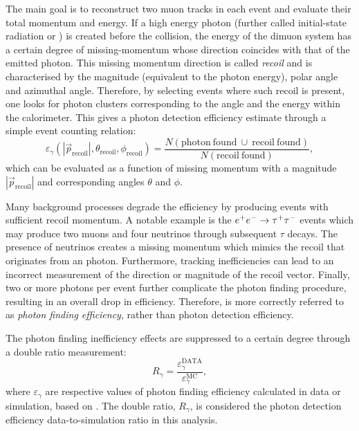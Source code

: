 The main goal is to reconstruct two muon tracks in each event and evaluate their total momentum and energy.
If a high energy photon (further called initial-state radiation or \ISR) is created before the collision, the energy of the dimuon system has a certain degree of missing-momentum whose direction coincides with that of the emitted photon.
This missing momentum direction is called \textit{recoil} and is characterised by the magnitude (equivalent to the photon energy), polar angle and azimuthal angle.
Therefore, by selecting events where such recoil is present, one looks for photon clusters corresponding to the angle and the energy within the calorimeter.
This gives a photon detection efficiency estimate through a simple event counting relation:
\begin{equation}\label{eq:photon_efficiency}
    \varepsilon_{\gamma}(|\vec{p}_{\mathrm{recoil}}|, \theta_{\mathrm{recoil}}, \phi_{\mathrm{recoil}}) = \frac{N(\mathrm{photon~found}~\cup~\mathrm{recoil~found})}{N(\mathrm{recoil~found})},
\end{equation}
which can be evaluated as a function of missing momentum with a magnitude $|\vec{p}_{\mathrm{recoil}}|$ and corresponding angles $\theta$ and $\phi$.

Many background processes degrade the efficiency by producing events with sufficient recoil momentum.
A notable example is the $e^+e^-\rightarrow\tau^+\tau^-$ events which may produce two muons and four neutrinos through subsequent $\tau$ decays.
The presence of neutrinos creates a missing momentum which mimics the recoil that originates from an \ISR photon.
Furthermore, tracking inefficiencies can lead to an incorrect measurement of the direction or magnitude of the recoil vector.
Finally, two or more \ISR photons per event further complicate the photon finding procedure, resulting in an overall drop in efficiency.
Therefore,  is more correctly referred to as \textit{photon finding efficiency}, rather than photon detection efficiency.

The photon finding inefficiency effects are suppressed to a certain degree through a double ratio measurement:
\begin{equation}\label{eq:photon_data_mc}
    R_{\gamma} = \frac{\varepsilon_{\gamma}^{\mathrm{DATA}}}{\varepsilon_{\gamma}^{\mathrm{MC}}},
\end{equation}
where $\varepsilon_{\gamma}$ are respective values of photon finding efficiency calculated in data or simulation, based on .
The double ratio, $R_{\gamma}$, is considered the photon detection efficiency data-to-simulation ratio in this analysis.

